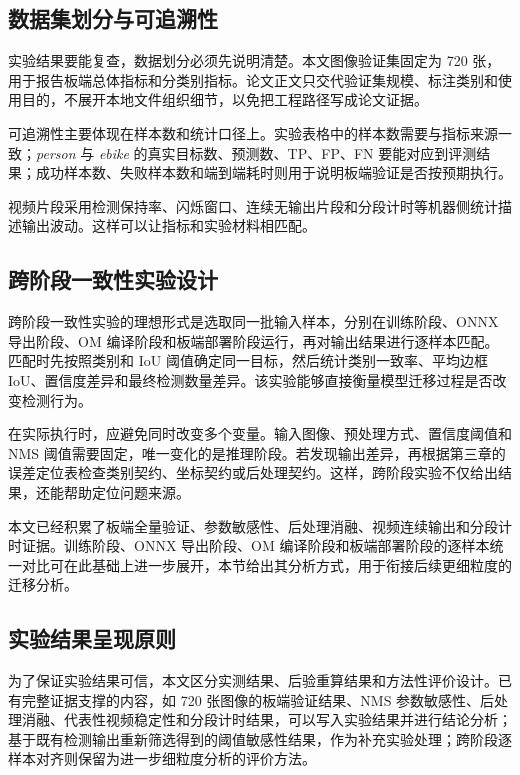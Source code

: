 \subsection{数据集划分与可追溯性}

实验结果要能复查，数据划分必须先说明清楚。本文图像验证集固定为 720 张，用于报告板端总体指标和分类别指标。论文正文只交代验证集规模、标注类别和使用目的，不展开本地文件组织细节，以免把工程路径写成论文证据。

可追溯性主要体现在样本数和统计口径上。实验表格中的样本数需要与指标来源一致；\textit{person} 与 \textit{ebike} 的真实目标数、预测数、TP、FP、FN 要能对应到评测结果；成功样本数、失败样本数和端到端耗时则用于说明板端验证是否按预期执行。

视频片段采用检测保持率、闪烁窗口、连续无输出片段和分段计时等机器侧统计描述输出波动。这样可以让指标和实验材料相匹配。


\subsection{跨阶段一致性实验设计}

跨阶段一致性实验的理想形式是选取同一批输入样本，分别在训练阶段、ONNX 导出阶段、OM 编译阶段和板端部署阶段运行，再对输出结果进行逐样本匹配。匹配时先按照类别和 IoU 阈值确定同一目标，然后统计类别一致率、平均边框 IoU、置信度差异和最终检测数量差异。该实验能够直接衡量模型迁移过程是否改变检测行为。

在实际执行时，应避免同时改变多个变量。输入图像、预处理方式、置信度阈值和 NMS 阈值需要固定，唯一变化的是推理阶段。若发现输出差异，再根据第三章的误差定位表检查类别契约、坐标契约或后处理契约。这样，跨阶段实验不仅给出结果，还能帮助定位问题来源。

本文已经积累了板端全量验证、参数敏感性、后处理消融、视频连续输出和分段计时证据。训练阶段、ONNX 导出阶段、OM 编译阶段和板端部署阶段的逐样本统一对比可在此基础上进一步展开，本节给出其分析方式，用于衔接后续更细粒度的迁移分析。


\subsection{实验结果呈现原则}

为了保证实验结果可信，本文区分实测结果、后验重算结果和方法性评价设计。已有完整证据支撑的内容，如 720 张图像的板端验证结果、NMS 参数敏感性、后处理消融、代表性视频稳定性和分段计时结果，可以写入实验结果并进行结论分析；基于既有检测输出重新筛选得到的阈值敏感性结果，作为补充实验处理；跨阶段逐样本对齐则保留为进一步细粒度分析的评价方法。


